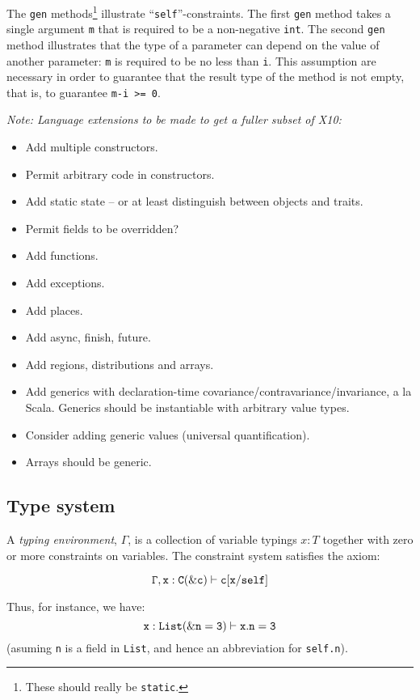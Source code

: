 \documentclass{article}
\def\Xten{{\sf X10}}
\begin{document}
\begin{example}[List]
The {\tt gen} methods\footnote{These should really be {\tt static}.}
illustrate ``{\tt self}''-constraints. The first {\tt gen} method
takes a single argument {\tt m} that is required to be a non-negative
{\tt int}.  The second {\tt gen} method illustrates that the type of a
parameter can depend on the value of another parameter: {\tt m} is
required to be no less than {\tt i}. This assumption are necessary in
order to guarantee that the result type of the method is not empty,
that is, to guarantee {\tt m-i >= 0}.
\end{example}

{\em Note:
Language extensions to be made to get a fuller subset of \Xten:

\begin{itemize}
  \item Add multiple constructors.
  \item Permit arbitrary code in constructors.
  \item Add static state -- or at least distinguish between objects and traits.
  \item Permit fields to be overridden?
  \item Add functions.
  \item Add exceptions.
  \item Add places.
  \item Add async, finish, future.
  \item Add regions, distributions and arrays.
  \item Add generics with declaration-time
  covariance/contravariance/invariance, a la Scala.  Generics should
  be instantiable with arbitrary value types.
  \item Consider adding generic values (universal quantification).
  \item Arrays should be generic.
\end{itemize}
}

\subsection{Type system}
A {\em typing environment}, $\Gamma$, is a collection of variable
typings $x:T$ together with zero or more constraints on variables. The
constraint system satisfies the axiom:

$$
\tt \Gamma, x:C(\&c) \vdash c[x/self]
$$

\noindent Thus, for instance, we have:
$$
\tt x:List(\& n=3) \vdash x.n=3
$$
\noindent (asuming {\tt n} is a field in {\tt List}, and hence an abbreviation for {\tt self.n}).
\end{document}
